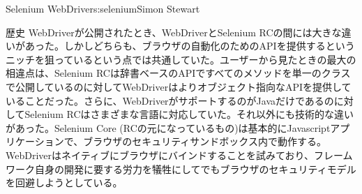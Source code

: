 \begin{aosachapter}{Selenium WebDriver}{s:selenium}{Simon Stewart}
\begin{aosasect1}{歴史}
WebDriverが公開されたとき、WebDriverとSelenium RCの間には大きな違いがあった。しかしどちらも、ブラウザの自動化のためのAPIを提供するというニッチを狙っているという点では共通していた。ユーザーから見たときの最大の相違点は、Selenium RCは辞書ベースのAPIですべてのメソッドを単一のクラスで公開しているのに対してWebDriverはよりオブジェクト指向なAPIを提供していることだった。さらに、WebDriverがサポートするのがJavaだけであるのに対してSelenium RCはさまざまな言語に対応していた。それ以外にも技術的な違いがあった。Selenium Core (RCの元になっているもの)は基本的にJavascriptアプリケーションで、ブラウザのセキュリティサンドボックス内で動作する。WebDriverはネイティブにブラウザにバインドすることを試みており、フレームワーク自身の開発に要する労力を犠牲にしてでもブラウザのセキュリティモデルを回避しようとしている。


\end{aosasect1}
\end{aosachapter}
